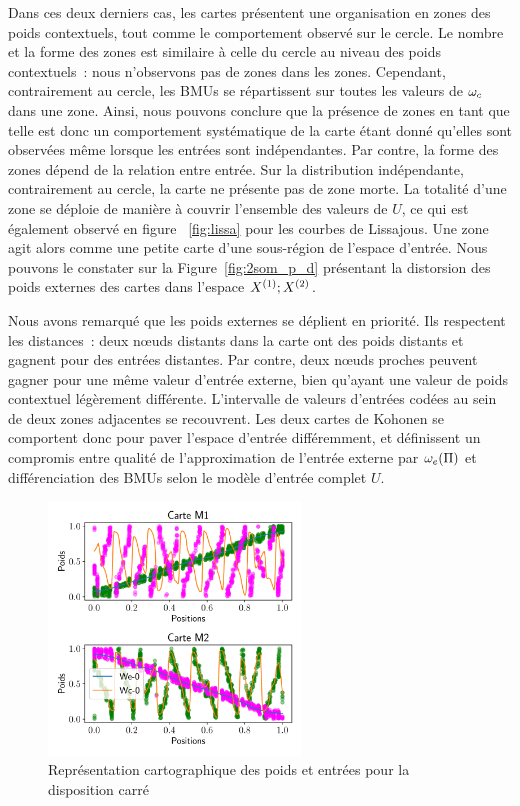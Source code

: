 \documentclass[../main]{subfiles}
\begin{document}
Dans ces deux derniers cas, les cartes présentent une organisation en zones des poids contextuels, tout comme le comportement observé sur le cercle. Le nombre et la forme des zones est similaire à celle du cercle au niveau des poids contextuels~: nous n'observons pas de zones dans les zones. Cependant, contrairement au cercle, les BMUs se répartissent sur toutes les valeurs de $\omega_c$ dans une zone.
Ainsi, nous pouvons conclure que la présence de zones en tant que telle est donc un comportement systématique de la carte étant donné qu'elles sont observées même lorsque les entrées sont indépendantes. Par contre, la forme des zones dépend de la relation entre entrée.
Sur la distribution indépendante, contrairement au cercle, la carte ne présente pas de zone morte. La totalité d'une zone se déploie de manière à couvrir l'ensemble des valeurs de $U$, ce qui est également observé en figure ~\ref{fig:lissa} pour les courbes de Lissajous.
Une zone agit alors comme une petite carte d'une sous-région de l'espace d'entrée. Nous pouvons le constater sur la Figure~\ref{fig:2som_p_d} présentant la distorsion des poids externes des cartes dans l'espace $X^{({1})}; X^{({2})}$.


Nous avons remarqué que les poids externes se déplient en priorité. Ils respectent les distances~: deux n\oe{}uds distants dans la carte ont des poids distants et gagnent pour des entrées distantes.  
Par contre, deux n\oe{}uds proches peuvent gagner pour une même valeur d'entrée externe, bien qu'ayant une valeur de poids contextuel légèrement différente.
L'intervalle de valeurs d'entrées codées au sein de deux zones adjacentes se recouvrent.
Les deux cartes de Kohonen se comportent donc pour paver l'espace d'entrée différemment, et définissent un compromis entre qualité de l'approximation de l'entrée externe par $\omega_e(\Pi)$ et différenciation des BMUs selon le modèle d'entrée complet $U$.


\begin{figure}
	\centering\includegraphics[width=0.6\textwidth]{2som_square_w.pdf}
	\caption{Représentation cartographique des poids et entrées pour la disposition carré}
\end{figure}
\end{document}
